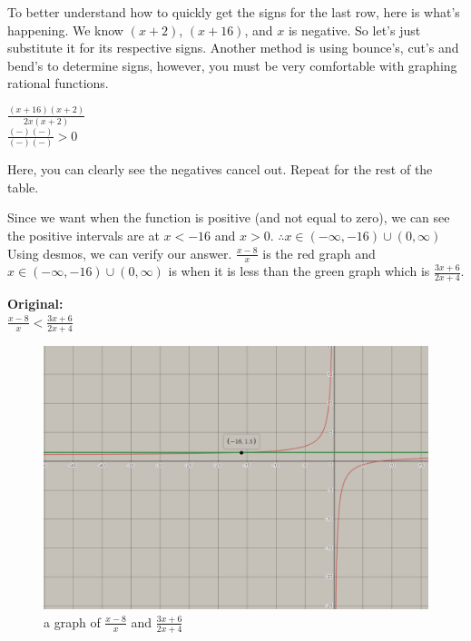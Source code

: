 \documentclass[12pt,fleqn]{book} %
\begin{document}
\noindent To better understand how to quickly get the signs for the last row, here is what's happening. We know $(x+2)$, $(x+16)$, and $x$ is negative. So let's just substitute it for its respective signs. Another method is using bounce's, cut's and bend's to determine signs, however, you must be very comfortable with graphing rational functions.

\pagebreak

\begin{center}
\begin{multicols}{2}
\LARGE{$\frac{(x+16)(x+2)}{2x(x+2)}$}\\
\columnbreak
\LARGE{$\frac{(-)(-)}{(-)(-)}> 0$}\\
\end{multicols}
\end{center}

\noindent Here, you can clearly see the negatives cancel out. Repeat for the rest of the table.

\noindent Since we want when the function is positive (and not equal to zero), we can see the positive intervals are at $x<-16$ and $x>0$. $\therefore x\in (-\infty,-16)\cup(0,\infty)$ Using desmos, we can verify our answer. $\frac{x-8}{x}$ is the red graph and $x\in (-\infty,-16)\cup(0,\infty)$ is when it is less than the green graph which is $\frac{3x+6}{2x+4}$.\\

\vspace*{-12mm}

\begin{center}
    \large{\textbf{Original:}}\\
    \LARGE{$\frac{x-8}{x}<\frac{3x+6}{2x+4}$}\\
\end{center}

\vspace*{-5mm}

\begin{figure}[h]
\centering\includegraphics[scale=0.3]{Pictures/Proof1.PNG}
\caption{a graph of $\frac{x-8}{x}$ and $\frac{3x+6}{2x+4}$}
\end{figure}
\end{document}
